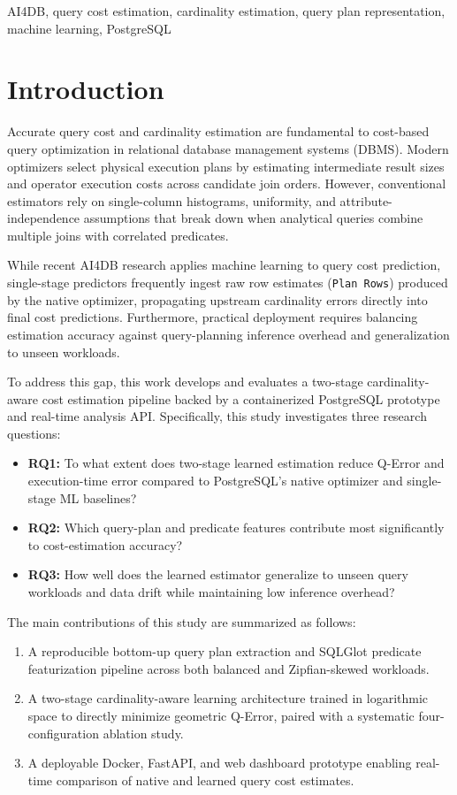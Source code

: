 \documentclass[conference]{IEEEtran}
\begin{document}
\begin{IEEEkeywords}
AI4DB, query cost estimation, cardinality estimation, query plan representation, machine learning, PostgreSQL
\end{IEEEkeywords}

\section{Introduction}
Accurate query cost and cardinality estimation are fundamental to cost-based query optimization in relational database management systems (DBMS). Modern optimizers select physical execution plans by estimating intermediate result sizes and operator execution costs across candidate join orders. However, conventional estimators rely on single-column histograms, uniformity, and attribute-independence assumptions that break down when analytical queries combine multiple joins with correlated predicates.

While recent AI4DB research applies machine learning to query cost prediction, single-stage predictors frequently ingest raw row estimates (\texttt{Plan Rows}) produced by the native optimizer, propagating upstream cardinality errors directly into final cost predictions. Furthermore, practical deployment requires balancing estimation accuracy against query-planning inference overhead and generalization to unseen workloads.

To address this gap, this work develops and evaluates a two-stage cardinality-aware cost estimation pipeline backed by a containerized PostgreSQL prototype and real-time analysis API. Specifically, this study investigates three research questions:
\begin{itemize}
    \item \textbf{RQ1:} To what extent does two-stage learned estimation reduce Q-Error and execution-time error compared to PostgreSQL's native optimizer and single-stage ML baselines?
    \item \textbf{RQ2:} Which query-plan and predicate features contribute most significantly to cost-estimation accuracy?
    \item \textbf{RQ3:} How well does the learned estimator generalize to unseen query workloads and data drift while maintaining low inference overhead?
\end{itemize}

The main contributions of this study are summarized as follows:
\begin{enumerate}
    \item A reproducible bottom-up query plan extraction and SQLGlot predicate featurization pipeline across both balanced and Zipfian-skewed workloads.
    \item A two-stage cardinality-aware learning architecture trained in logarithmic space to directly minimize geometric Q-Error, paired with a systematic four-configuration ablation study.
    \item A deployable Docker, FastAPI, and web dashboard prototype enabling real-time comparison of native and learned query cost estimates.
\end{enumerate}
\end{document}
